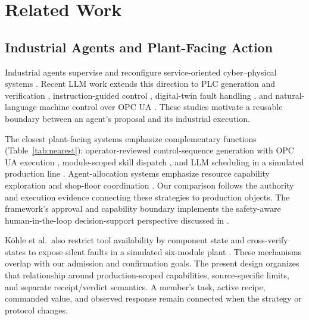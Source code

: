 \section{Related Work}
\label{sec:related}
\subsection{Industrial Agents and Plant-Facing Action}
Industrial agents supervise and reconfigure service-oriented cyber--physical systems
\cite{biskupovic2025supervision}. Recent LLM work extends this direction to
PLC generation and verification \cite{liu2026agents4plc}, instruction-guided
control \cite{wu2025instructmpc}, digital-twin fault handling
\cite{gill2025llmdt}, and natural-language machine control over OPC UA
\cite{hofmann2025nlc}. These studies motivate a reusable boundary between an
agent's proposal and its industrial execution.

The closest plant-facing systems emphasize complementary functions
(Table~\ref{tab:nearest}): operator-reviewed control-sequence generation with
OPC UA execution \cite{huang2026made}, module-scoped skill dispatch
\cite{koehle2026llmdriven}, and LLM scheduling in a simulated production
line \cite{waseem2026pretrained}. Agent-allocation systems emphasize resource
capability exploration and shop-floor coordination
\cite{lim2025llmenabled,zhao2026shopfloor}. Our comparison follows the
authority and execution evidence connecting these strategies to production
objects. The framework's approval and capability boundary implements the
safety-aware human-in-the-loop decision-support perspective discussed in
\cite{jiang2026agentic}.

K{\"o}hle et al.\ also restrict tool availability by component state and
cross-verify states to expose silent faults in a simulated six-module plant
\cite{koehle2026llmdriven}. These mechanisms overlap with our admission and
confirmation goals. The present design organizes that relationship around
production-scoped capabilities, source-specific limits, and separate
receipt/verdict semantics. A member's task, active recipe, commanded value,
and observed response remain connected when the strategy or protocol changes.

